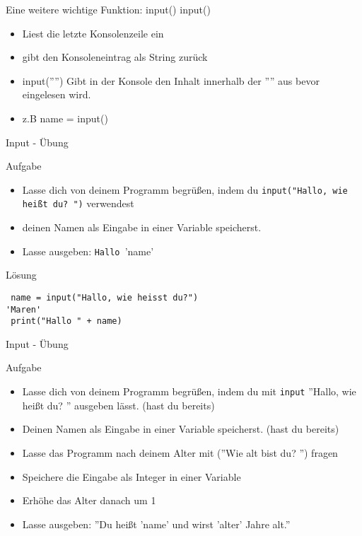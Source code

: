 \begin{frame}[fragile]{Eine weitere wichtige Funktion: input()}
input()
\begin{itemize}
\item Liest die letzte Konsolenzeile ein
\item gibt den Konsoleneintrag als String zurück
\item input('''') Gibt in der Konsole den Inhalt innerhalb der '''' aus bevor eingelesen wird.
\item z.B name = input() 
\end{itemize}
\end{frame}

\begin{frame}[fragile]{Input - Übung}   
\begin{block}{Aufgabe}
\begin{itemize}


\item Lasse dich von deinem Programm begrüßen, indem du
  \texttt{input("Hallo, wie heißt du? ")} verwendest
\item deinen Namen als Eingabe in einer Variable speicherst. 
\item Lasse ausgeben: \texttt{Hallo }'name'
\end{itemize}
\end{block}
\pause{}
\begin{exampleblock}{Lösung}
\begin{lstlisting}
 name = input("Hallo, wie heisst du?")
'Maren'
 print("Hallo " + name)
\end{lstlisting}
\end{exampleblock}
\end{frame}

\begin{frame}[fragile]{Input - Übung}   
\begin{block}{Aufgabe}
	\begin{itemize}
		\item Lasse dich von deinem Programm begrüßen, indem du mit \texttt{input} ''Hallo, wie heißt du? '' ausgeben lässt. (hast du bereits)
		\item Deinen Namen als Eingabe in einer Variable speicherst. (hast du bereits)
		\item Lasse das Programm nach deinem Alter mit (''Wie alt bist du? '') fragen
		\item Speichere die Eingabe als Integer in einer Variable 
		\item Erhöhe das Alter danach um 1
		\item Lasse ausgeben: ''Du heißt 'name' und wirst 'alter' Jahre alt.''
	\end{itemize}
\end{block}
\end{frame}

